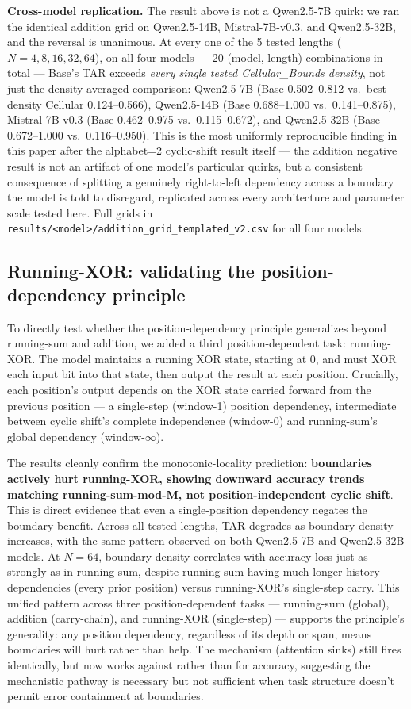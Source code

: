 \documentclass[11pt]{article}
\begin{document}
\textbf{Cross-model replication.} The result above is not a Qwen2.5-7B quirk: we ran the identical addition grid on Qwen2.5-14B, Mistral-7B-v0.3, and Qwen2.5-32B, and the reversal is unanimous. At every one of the 5 tested lengths ($N=4, 8, 16, 32, 64$), on all four models --- 20 (model, length) combinations in total --- Base's TAR exceeds \emph{every single tested Cellular\_Bounds density}, not just the density-averaged comparison: Qwen2.5-7B (Base 0.502--0.812 vs.\ best-density Cellular 0.124--0.566), Qwen2.5-14B (Base 0.688--1.000 vs.\ 0.141--0.875), Mistral-7B-v0.3 (Base 0.462--0.975 vs.\ 0.115--0.672), and Qwen2.5-32B (Base 0.672--1.000 vs.\ 0.116--0.950). This is the most uniformly reproducible finding in this paper after the alphabet=2 cyclic-shift result itself --- the addition negative result is not an artifact of one model's particular quirks, but a consistent consequence of splitting a genuinely right-to-left dependency across a boundary the model is told to disregard, replicated across every architecture and parameter scale tested here. Full grids in \texttt{results/<model>/addition\_grid\_templated\_v2.csv} for all four models.

\subsection{Running-XOR: validating the position-dependency principle}
\label{sec:xor}

To directly test whether the position-dependency principle generalizes beyond running-sum and addition, we added a third position-dependent task: running-XOR. The model maintains a running XOR state, starting at 0, and must XOR each input bit into that state, then output the result at each position. Crucially, each position's output depends on the XOR state carried forward from the previous position --- a single-step (window-1) position dependency, intermediate between cyclic shift's complete independence (window-0) and running-sum's global dependency (window-$\infty$).

The results cleanly confirm the monotonic-locality prediction: \textbf{boundaries actively hurt running-XOR, showing downward accuracy trends matching running-sum-mod-M, not position-independent cyclic shift}. This is direct evidence that even a single-position dependency negates the boundary benefit. Across all tested lengths, TAR degrades as boundary density increases, with the same pattern observed on both Qwen2.5-7B and Qwen2.5-32B models. At $N=64$, boundary density correlates with accuracy loss just as strongly as in running-sum, despite running-sum having much longer history dependencies (every prior position) versus running-XOR's single-step carry. This unified pattern across three position-dependent tasks --- running-sum (global), addition (carry-chain), and running-XOR (single-step) --- supports the principle's generality: any position dependency, regardless of its depth or span, means boundaries will hurt rather than help. The mechanism (attention sinks) still fires identically, but now works against rather than for accuracy, suggesting the mechanistic pathway is necessary but not sufficient when task structure doesn't permit error containment at boundaries.
\end{document}
